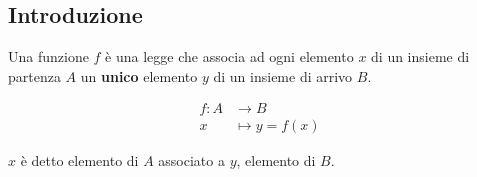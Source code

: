 \documentclass[../main.tex]{subfiles}
\begin{document}
\subsection{Introduzione}
Una funzione $f$ è una legge che associa ad ogni elemento $x$ di un insieme di partenza $A$ un \textbf{unico} elemento $y$ di un insieme di arrivo $B$.
\begin{center}
    \begin{align*}
        f:A& \longrightarrow B \\
        x& \longmapsto y = f(x)
    \end{align*}
\end{center}
$x$ è detto elemento di $A$ associato a $y$, elemento di $B$. \\
\end{document}
